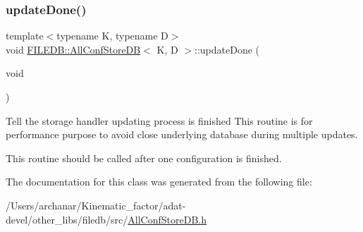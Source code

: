 \subsubsection{\texorpdfstring{updateDone()}{updateDone()}\hspace{0.1cm}{\footnotesize\ttfamily [3/3]}}
{\footnotesize\ttfamily template$<$typename K, typename D$>$ \\
void \mbox{\hyperlink{classFILEDB_1_1AllConfStoreDB}{F\+I\+L\+E\+D\+B\+::\+All\+Conf\+Store\+DB}}$<$ K, D $>$\+::update\+Done (\begin{DoxyParamCaption}\item[{void}]{ }\end{DoxyParamCaption})\hspace{0.3cm}{\ttfamily [inline]}}

Tell the storage handler updating process is finished This routine is for performance purpose to avoid close underlying database during multiple updates.

This routine should be called after one configuration is finished. 

The documentation for this class was generated from the following file\+:\begin{DoxyCompactItemize}
\item 
/\+Users/archanar/\+Kinematic\+\_\+factor/adat-\/devel/other\+\_\+libs/filedb/src/\mbox{\hyperlink{adat-devel_2other__libs_2filedb_2src_2AllConfStoreDB_8h}{All\+Conf\+Store\+D\+B.\+h}}\end{DoxyCompactItemize}
